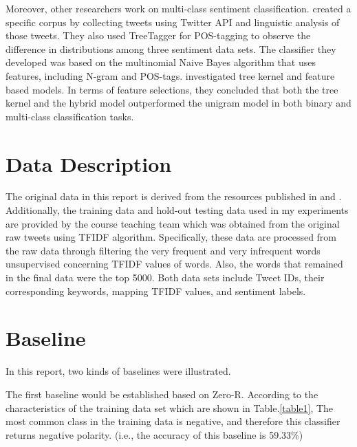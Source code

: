\documentclass[11pt]{article}
\newcommand{\reft}[1]{Table.\ref{#1}}
\begin{document}
Moreover, other researchers work on multi-class sentiment classification. \cite{pak-paroubek-2010-twitter} created a specific corpus by collecting tweets using Twitter API and linguistic analysis of those tweets. They also used TreeTagger for POS-tagging to observe the difference in distributions among three sentiment data sets. The classifier they developed was based on the multinomial Naive Bayes algorithm that uses features, including N-gram and POS-tags.  \cite{agarwal-etal-2011-sentiment} investigated tree kernel and feature based models.  In terms of feature selections, they concluded that both the tree kernel and the hybrid model outperformed the unigram model in both binary and multi-class classification tasks. 

\section{ Data Description}
The original data in this report is derived from the resources published in \cite{Vadicamo_2017_ICCV} and  \cite{Go_Bhayani_Huang_2009}. Additionally, the training data and hold-out testing data used in my experiments are provided by the course teaching team which was obtained from the original raw tweets using TFIDF algorithm. Specifically, these data are processed from the raw data through filtering the very frequent and very infrequent words unsupervised concerning TFIDF values of words. Also, the words that remained in the final data were the top 5000. Both data sets include Tweet IDs, their corresponding keywords, mapping TFIDF values, and sentiment labels.
\section{Baseline}
In this report, two kinds of baselines were illustrated. 

The first baseline would be established based on Zero-R. According to the characteristics of the training data set which are shown in \reft{table1}, The most common class in the training data is negative, and therefore this classifier returns negative polarity. (i.e., the accuracy of this baseline is 59.33\%) 
\end{document}
